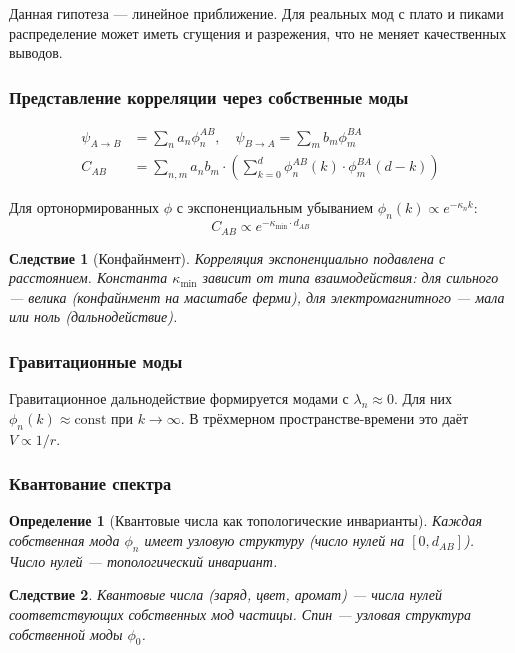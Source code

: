 \documentclass[12pt,a4paper]{article}
\newtheorem{definition}{Определение}[section]
\newtheorem{corollary}{Следствие}[section]
\begin{document}
Данная гипотеза --- линейное приближение. Для реальных мод с плато и пиками распределение может иметь сгущения и разрежения, что не меняет качественных выводов.

\subsubsection{Представление корреляции через собственные моды}

\begin{align}
    \psi_{A \to B} &= \sum_n a_n \phi_n^{AB}, \quad \psi_{B \to A} = \sum_m b_m \phi_m^{BA} \\
    C_{AB} &= \sum_{n,m} a_n b_m \cdot \left( \sum_{k=0}^{d} \phi_n^{AB}(k) \cdot \phi_m^{BA}(d-k) \right)
\end{align}

Для ортонормированных $\phi$ с экспоненциальным убыванием $\phi_n(k) \propto e^{-\kappa_n k}$:
\begin{equation}
    C_{AB} \propto e^{-\kappa_{\min} \cdot d_{AB}}
\end{equation}

\begin{corollary}[Конфайнмент]
Корреляция экспоненциально подавлена с расстоянием. Константа $\kappa_{\min}$ зависит от типа взаимодействия: для сильного --- велика (конфайнмент на масштабе ферми), для электромагнитного --- мала или ноль (дальнодействие).
\end{corollary}

\subsubsection{Гравитационные моды}

Гравитационное дальнодействие формируется модами с $\lambda_n \approx 0$. Для них $\phi_n(k) \approx \text{const}$ при $k \to \infty$. В трёхмерном пространстве-времени это даёт $V \propto 1/r$.

\subsubsection{Квантование спектра}

\begin{definition}[Квантовые числа как топологические инварианты]
Каждая собственная мода $\phi_n$ имеет узловую структуру (число нулей на $[0, d_{AB}]$). Число нулей --- топологический инвариант.
\end{definition}

\begin{corollary}
Квантовые числа (заряд, цвет, аромат) --- числа нулей соответствующих собственных мод частицы. Спин --- узловая структура собственной моды $\phi_0$.
\end{corollary}
\end{document}
